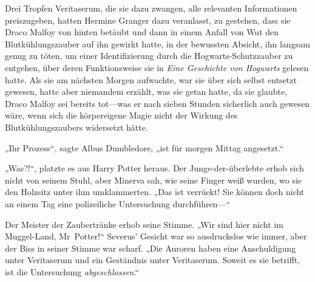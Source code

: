 Drei Tropfen Veritaserum, die sie dazu zwangen, alle relevanten Informationen preiszugeben, hatten Hermine Granger dazu veranlasst, zu gestehen, dass sie Draco Malfoy von hinten betäubt und dann in einem Anfall von Wut den Blutkühlungszauber auf ihn gewirkt hatte, in der bewussten Absicht, ihn langsam genug zu töten, um einer Identifizierung durch die Hogwarts-Schutzzauber zu entgehen, über deren Funktionsweise sie in \emph{Eine Geschichte von Hogwarts} gelesen hatte. Als sie am nächsten Morgen aufwachte, war sie über sich selbst entsetzt gewesen, hatte aber niemandem erzählt, was sie getan hatte, da sie glaubte, Draco Malfoy sei bereits tot—was er nach sieben Stunden sicherlich auch gewesen wäre, wenn sich die körpereigene Magie nicht der Wirkung des Blutkühlungszaubers widersetzt hätte.

„Ihr Prozess“, sagte Albus Dumbledore, „ist für morgen Mittag angesetzt.“

„Was?!“, platzte es aus Harry Potter heraus. Der Junge-der-überlebte erhob sich nicht von seinem Stuhl, aber Minerva sah, wie seine Finger weiß wurden, wo sie den Holzsitz unter ihm umklammerten.
„Das ist verrückt! Sie können doch nicht an einem Tag eine polizeiliche Untersuchung durchführen—“

Der Meister der Zaubertränke erhob seine Stimme.
„Wir sind hier nicht im Muggel-Land, Mr~Potter!“ Severus’ Gesicht war so ausdruckslos wie immer, aber der Biss in seiner Stimme war scharf.
„Die Auroren haben eine Anschuldigung unter Veritaserum und ein Geständnis unter Veritaserum. Soweit es sie betrifft, ist die Untersuchung \emph{abgeschlossen}.“

